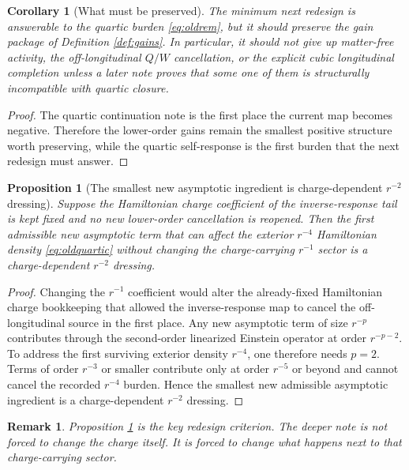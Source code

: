 \documentclass[11pt]{article}
\newtheorem{proposition}{Proposition}
\newtheorem{remark}{Remark}
\newtheorem{corollary}{Corollary}
\begin{document}
\begin{corollary}[What must be preserved]
\label{cor:preserve}
The minimum next redesign is answerable to the quartic burden \eqref{eq:oldrem}, but it should preserve the gain package of Definition \ref{def:gains}. In particular, it should not give up matter-free activity, the off-longitudinal \(Q/W\) cancellation, or the explicit cubic longitudinal completion unless a later note proves that some one of them is structurally incompatible with quartic closure.
\end{corollary}

\begin{proof}
The quartic continuation note is the first place the current map becomes negative. Therefore the lower-order gains remain the smallest positive structure worth preserving, while the quartic self-response is the first burden that the next redesign must answer.
\end{proof}

\begin{proposition}[The smallest new asymptotic ingredient is charge-dependent \(r^{-2}\) dressing]
\label{prop:rminus2}
Suppose the Hamiltonian charge coefficient of the inverse-response tail is kept fixed and no new lower-order cancellation is reopened. Then the first admissible new asymptotic term that can affect the exterior \(r^{-4}\) Hamiltonian density \eqref{eq:oldquartic} without changing the charge-carrying \(r^{-1}\) sector is a charge-dependent \(r^{-2}\) dressing.
\end{proposition}

\begin{proof}
Changing the \(r^{-1}\) coefficient would alter the already-fixed Hamiltonian charge bookkeeping that allowed the inverse-response map to cancel the off-longitudinal source in the first place. Any new asymptotic term of size \(r^{-p}\) contributes through the second-order linearized Einstein operator at order \(r^{-p-2}\). To address the first surviving exterior density \(r^{-4}\), one therefore needs \(p=2\). Terms of order \(r^{-3}\) or smaller contribute only at order \(r^{-5}\) or beyond and cannot cancel the recorded \(r^{-4}\) burden. Hence the smallest new admissible asymptotic ingredient is a charge-dependent \(r^{-2}\) dressing.
\end{proof}

\begin{remark}
Proposition \ref{prop:rminus2} is the key redesign criterion. The deeper note is not forced to change the charge itself. It is forced to change what happens \emph{next} to that charge-carrying sector.
\end{remark}
\end{document}
